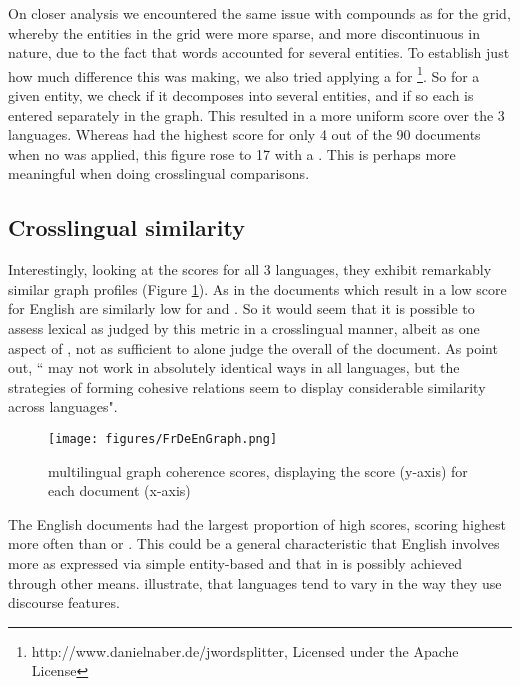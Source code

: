 \documentclass[output=paper]{langsci/langscibook.cls}
\begin{document}
On closer analysis we encountered the same issue with  compounds as for the grid, whereby the entities in the  grid were more sparse, and more discontinuous in nature, due to the fact that  words accounted for several entities. To establish just how much difference this was making, we also tried applying a  for \footnote{http://www.danielnaber.de/jwordsplitter, Licensed under the Apache License}. So for a given entity, we check if it decomposes into several entities, and if so each is entered separately in the graph. This resulted in a more uniform  score over the 3 languages. Whereas  had the highest  score for only 4 out of the 90 documents when no  was applied, this figure rose to 17 with a . This is perhaps more meaningful when doing crosslingual comparisons. 

\subsection{Crosslingual similarity}
Interestingly, looking at the  scores for all 3 languages, they exhibit remarkably similar graph profiles (Figure \ref{fig:FrDeEnGraph}). As in the documents which result in a low score for English are similarly low for  and . So it would seem that it is possible to assess lexical  as judged by this metric in a crosslingual manner, albeit as one aspect of , not as sufficient to alone judge the overall  of the document.
As \citet{tanskanen2006collaborating} %
point out, `` may not work in absolutely identical ways in all languages, but the strategies of forming cohesive relations seem to display considerable similarity across languages". 


\begin{figure}
\texttt{[image: figures/FrDeEnGraph.png]}
\caption{multilingual graph coherence scores, displaying the score (y-axis) for each document (x-axis)}\label{fig:FrDeEnGraph}
\end{figure}

The English documents had the largest proportion of high  scores, scoring highest more often than  or . 
This could be a general characteristic that English involves more  as expressed via simple entity-based  and that in   is possibly achieved through other means.
\citet{lapshinova2015exploration} illustrate, that languages tend to vary in the way they use discourse features.
\end{document}
